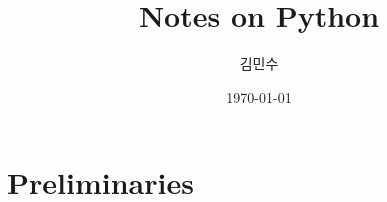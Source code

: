 \documentclass[
    ebook,
    12pt,
    oneside,
    openany,
    final
]{memoir}
\title{Notes on Python}
\author{김민수}
\date{\today}
\begin{document}
\frontmatter
\maketitle
\clearpage

\tableofcontents
\clearpage
\mainmatter

\part{Preliminaries}
%

\appendix

\backmatter
\end{document}
